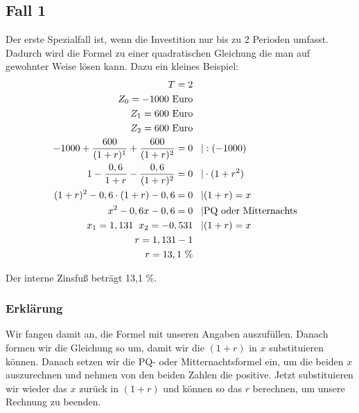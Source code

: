 \subsection{Fall 1}
Der erste Spezialfall ist, wenn die Investition nur bis zu 2 Perioden umfasst. Dadurch wird die Formel zu einer quadratischen Gleichung die man auf gewohnter Weise lösen kann. Dazu ein kleines Beispiel:
\begin{align*}
    T = 2                                                                                                 \\
    Z_0 =-1000 \text{ Euro}                                                                               \\
    Z_1 = 600 \text{ Euro}                                                                                \\
    Z_2 = 600 \text{ Euro}                                                                                \\
    -1000 + \frac{600}{(1+r)^1} + \frac{600}{(1+r)^2} = 0 & \text{\phantom m}|:(-1000)                    \\
    1 - \frac{0,6}{1+r} - \frac{0,6}{(1+r)^2} = 0         & \text{\phantom m}|\cdot(1+r^2)                \\
    (1+r)^2 - 0,6\cdot(1+r) - 0,6 = 0                     & \text{\phantom m}|(1+r) = x                   \\
    x^2-0,6x-0,6=0                                        & \text{\phantom m}|\text{PQ oder Mitternachts} \\
    x_1 = 1,131 \text{\phantom p} x_2 = -0,531            & \text{\phantom m}|(1+r) = x                   \\
    r = 1,131 - 1                                                                                         \\
    r = 13,1 \text{ \%}
\end{align*}
\begin{center}
    Der interne Zinsfuß beträgt 13,1 \%.
\end{center}
\subsubsection{Erklärung}
\smallskip
Wir fangen damit an, die Formel mit unseren Angaben auszufüllen. Danach formen wir die Gleichung so um, damit wir die $(1+r)$ in $x$ substituieren können. Danach setzen wir die PQ-
oder Mitternachtsformel ein, um die beiden $x$ auszurechnen und nehmen von den beiden Zahlen die positive. Jetzt substituieren wir wieder das $x$ zurück in $(1+r)$ und können so das $r$ berechnen, um unsere Rechnung zu beenden.
\newpage
